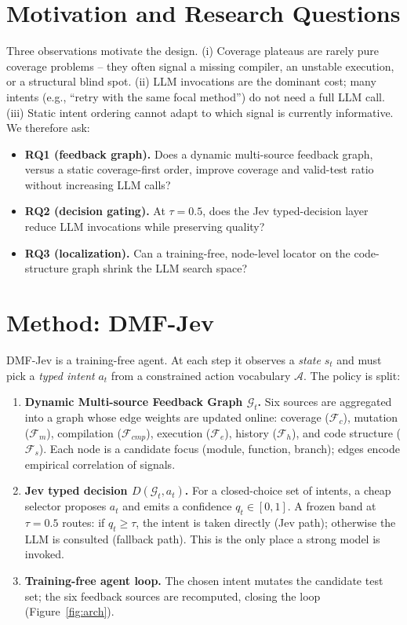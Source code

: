 \documentclass[11pt]{article}
\begin{document}
\section{Motivation and Research Questions}
Three observations motivate the design. (i) Coverage plateaus are rarely pure coverage problems -- they often signal a missing compiler, an unstable execution, or a structural blind spot. (ii) LLM invocations are the dominant cost; many intents (e.g., ``retry with the same focal method'') do not need a full LLM call. (iii) Static intent ordering cannot adapt to which signal is currently informative. We therefore ask:
\begin{itemize}
  \item \textbf{RQ1 (feedback graph).} Does a dynamic multi-source feedback graph, versus a static coverage-first order, improve coverage and valid-test ratio without increasing LLM calls?
  \item \textbf{RQ2 (decision gating).} At $\tau=0.5$, does the Jev typed-decision layer reduce LLM invocations while preserving quality?
  \item \textbf{RQ3 (localization).} Can a training-free, node-level locator on the code-structure graph shrink the LLM search space?
\end{itemize}

\section{Method: DMF-Jev}
\label{sec:method}
DMF-Jev is a training-free agent. At each step it observes a \emph{state} $s_t$ and must pick a \emph{typed intent} $a_t$ from a constrained action vocabulary $\mathcal{A}$. The policy is split:
\begin{enumerate}
  \item \textbf{Dynamic Multi-source Feedback Graph $\mathcal{G}_t$.} Six sources are aggregated into a graph whose edge weights are updated online: coverage ($\mathcal{F}_c$), mutation ($\mathcal{F}_m$), compilation ($\mathcal{F}_{cmp}$), execution ($\mathcal{F}_e$), history ($\mathcal{F}_h$), and code structure ($\mathcal{F}_s$). Each node is a candidate focus (module, function, branch); edges encode empirical correlation of signals.
  \item \textbf{Jev typed decision $D(\mathcal{G}_t, a_t)$.} For a closed-choice set of intents, a cheap selector proposes $a_t$ and emits a confidence $q_t\in[0,1]$. A frozen band at $\tau=0.5$ routes: if $q_t\ge \tau$, the intent is taken directly (Jev path); otherwise the LLM is consulted (fallback path). This is the only place a strong model is invoked.
  \item \textbf{Training-free agent loop.} The chosen intent mutates the candidate test set; the six feedback sources are recomputed, closing the loop (Figure~\ref{fig:arch}).
\end{enumerate}
\end{document}
